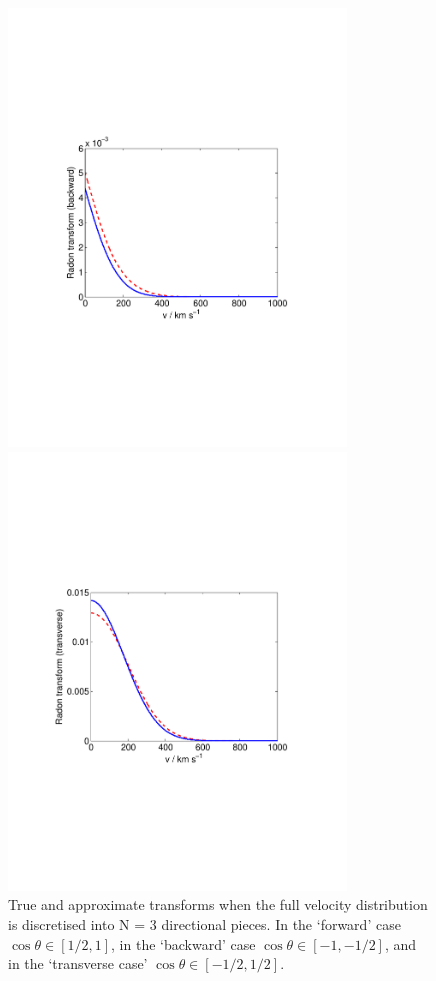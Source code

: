\begin{figure}[t]
  \includegraphics[trim={2cm 8cm 2cm 8cm},clip,width=0.80\textwidth]{Directional/N3-backward.pdf}

  \includegraphics[trim={2cm 8cm 2cm 8cm},clip,width=0.80\textwidth]{Directional/N3-transverse.pdf}

\caption{True and approximate transforms when the full velocity distribution is discretised into N = 3 directional pieces. In the `forward' case $\cos\theta \in [1/2,1]$, in the `backward' case $\cos\theta \in [-1, -1/2]$, and in the `transverse case' $\cos\theta \in [-1/2, 1/2]$.}
\end{figure}

